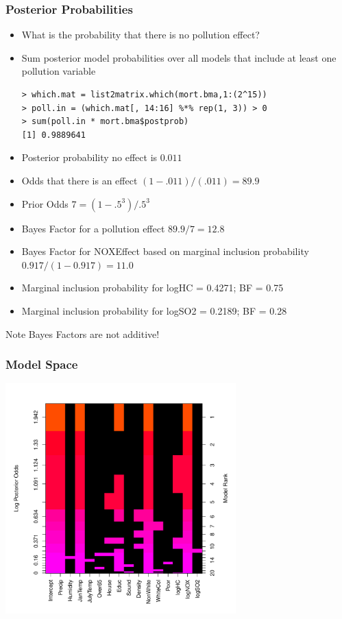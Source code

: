 \documentclass[handout]{beamer}
\begin{document}
\begin{frame}[fragile]
\frametitle{Posterior Probabilities}
  \begin{itemize}
  \item What is the probability that there is no pollution effect? \pause 
\item Sum posterior model probabilities over all models that include
  at least one pollution variable \pause 
\begin{verbatim}
> which.mat = list2matrix.which(mort.bma,1:(2^15))
> poll.in = (which.mat[, 14:16] %*% rep(1, 3)) > 0
> sum(poll.in * mort.bma$postprob)
[1] 0.9889641
\end{verbatim}\pause 
\item Posterior probability no effect is $0.011$ \pause 
\item Odds that there is an effect  $(1 - .011)/(.011) = 89.9$ \pause 
\item Prior Odds $7 = (1 - .5^3)/.5^3$ \pause 
\item Bayes Factor for a pollution effect $ 89.9/7= 12.8$ \pause 
\item Bayes Factor for NOXEffect  based on marginal inclusion probability
  $0.917/(1 - 0.917) = 11.0$ \pause  
\item Marginal inclusion probability for logHC =  0.4271; BF = 0.75
\item Marginal inclusion probability for logSO2 = 0.2189; BF = 0.28
\end{itemize}
Note Bayes Factors are not additive!
\end{frame}
\begin{frame}\frametitle{Model Space}
  \includegraphics[height=3.5in]{mort-image}
\end{frame}
\end{document}
